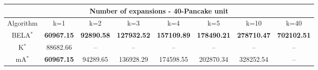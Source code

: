 \begin{tabular}{c|ccccccc}\toprule
\multicolumn{8}{c}{Number of expansions - 40-Pancake unit}\\ \midrule
Algorithm & k=1 & k=2 & k=3 & k=4 & k=5 & k=10 & k=40 \\ \midrule
BELA$^*$ & \textbf{60967.15} & \textbf{92890.58} & \textbf{127932.52} & \textbf{157109.89} & \textbf{178490.21} & \textbf{278710.47} & \textbf{702102.51} \\
K$^*$ & 88682.66 & -- & -- & -- & -- & -- & -- \\
mA$^*$ & \textbf{60967.15} & 94289.65 & 136928.29 & 174598.55 & 202870.34 & 328252.54 & -- \\ \bottomrule 
\end{tabular}

